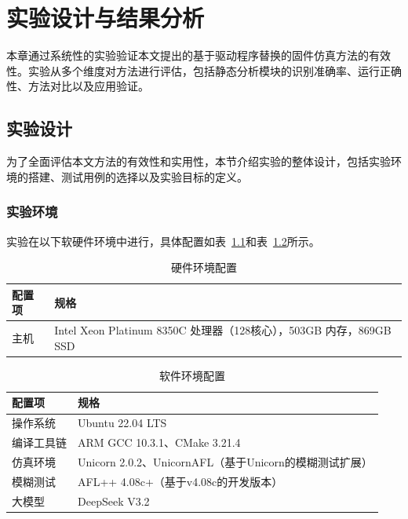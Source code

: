 \chapter{实验设计与结果分析}
\label{chap:exp}

本章通过系统性的实验验证本文提出的基于驱动程序替换的固件仿真方法的有效性。实验从多个维度对方法进行评估，包括静态分析模块的识别准确率、运行正确性、方法对比以及应用验证。

\section{实验设计}
\label{sec:design}

为了全面评估本文方法的有效性和实用性，本节介绍实验的整体设计，包括实验环境的搭建、测试用例的选择以及实验目标的定义。

\subsection{实验环境}

实验在以下软硬件环境中进行，具体配置如表~\ref{tab:hw_env}和表~\ref{tab:sw_env}所示。

\begin{table}[htbp]
\centering
\caption{硬件环境配置}
\label{tab:hw_env}
\small
\begin{tabular}{ll}
\toprule
\textbf{配置项} & \textbf{规格} \\
\midrule
主机 & Intel Xeon Platinum 8350C 处理器（128核心），503GB 内存，869GB SSD \\
\bottomrule
\end{tabular}
\end{table}

\begin{table}[htbp]
\centering
\caption{软件环境配置}
\label{tab:sw_env}
\small
\begin{tabular}{ll}
\toprule
\textbf{配置项} & \textbf{规格} \\
\midrule
操作系统 & Ubuntu 22.04 LTS \\
编译工具链 & ARM GCC 10.3.1、CMake 3.21.4 \\
仿真环境 & Unicorn 2.0.2、UnicornAFL（基于Unicorn的模糊测试扩展） \\
模糊测试 & AFL++ 4.08c+（基于v4.08c的开发版本） \\
大模型 & DeepSeek V3.2 \\
\bottomrule
\end{tabular}
\end{table}

